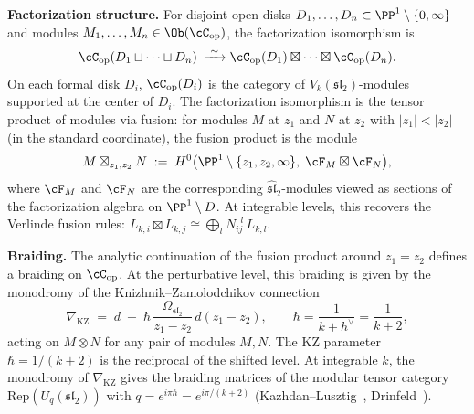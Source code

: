 \begin{definition}
\medskip\noindent
\textbf{Factorization structure.}
For disjoint open disks $D_1, \ldots, D_n \subset
\PP^1 \setminus \{0,\infty\}$ and modules
$M_1, \ldots, M_n \in \Ob(\cC_{\mathrm{op}})$, the
factorization isomorphism is
\begin{equation}\label{eq:benchmark-Cop-factorization}
 \cC_{\mathrm{op}}(D_1 \sqcup \cdots \sqcup D_n)
 \;\xrightarrow{\;\sim\;}
 \cC_{\mathrm{op}}(D_1)
 \boxtimes \cdots \boxtimes
 \cC_{\mathrm{op}}(D_n).
\end{equation}
On each formal disk $D_i$, $\cC_{\mathrm{op}}(D_i)$ is the
category of $V_k(\mathfrak{sl}_2)$-modules supported at the
center of $D_i$. The factorization isomorphism is the tensor
product of modules via fusion:
for modules $M$ at $z_1$ and $N$ at $z_2$ with
$|z_1| < |z_2|$ (in the standard coordinate), the fusion
product is the module
\begin{equation}\label{eq:benchmark-Cop-fusion}
 M \boxtimes_{z_1, z_2} N
 \;:=\;
 H^0\bigl(\PP^1 \setminus \{z_1, z_2, \infty\},\;
 \cF_M \boxtimes \cF_N\bigr),
\end{equation}
where $\cF_M$ and $\cF_N$ are the corresponding
$\widehat{\mathfrak{sl}}_2$-modules viewed as sections of the
factorization algebra on $\PP^1 \setminus D$. At integrable
levels, this recovers the Verlinde fusion rules:
$L_{k,i} \boxtimes L_{k,j} \cong \bigoplus_l N_{ij}^{\;\;l}\,
L_{k,l}$.

\medskip\noindent
\textbf{Braiding.}
The analytic continuation of the fusion product around
$z_1 = z_2$ defines a braiding on $\cC_{\mathrm{op}}$.
At the perturbative level, this braiding is given by the
monodromy of the Knizhnik--Zamolodchikov connection
\begin{equation}\label{eq:benchmark-KZ}
 \nabla_{\mathrm{KZ}}
 \;=\;
 d
 \;-\;
 \hbar\, \frac{\Omega_{\mathfrak{sl}_2}}{z_1 - z_2}\,
 d(z_1 - z_2),
 \qquad
 \hbar = \frac{1}{k + h^\vee} = \frac{1}{k + 2},
\end{equation}
acting on $M \otimes N$ for any pair of modules $M, N$.
The KZ parameter $\hbar = 1/(k+2)$ is the reciprocal of the
shifted level. At integrable $k$, the monodromy of
$\nabla_{\mathrm{KZ}}$ gives the braiding matrices of the
modular tensor category
$\mathrm{Rep}(U_q(\mathfrak{sl}_2))$ with
$q = e^{i\pi\hbar} = e^{i\pi/(k+2)}$
(Kazhdan--Lusztig~\cite{KL93},
Drinfeld~\cite{Dri89}).


\end{definition}

